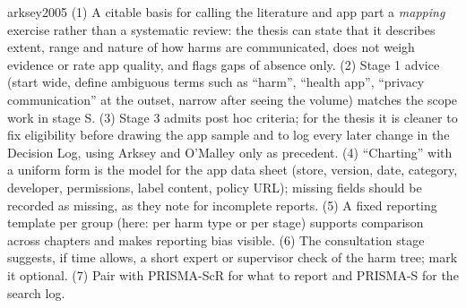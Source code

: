 \begin{papercard}{arksey2005}
 (1) A citable basis for calling the literature and app part a \emph{mapping} exercise rather than a systematic review: the thesis can state that it describes extent, range and nature of how harms are communicated, does not weigh evidence or rate app quality, and flags gaps of absence only. (2) Stage 1 advice (start wide, define ambiguous terms such as ``harm'', ``health app'', ``privacy communication'' at the outset, narrow after seeing the volume) matches the scope work in stage S. (3) Stage 3 admits post hoc criteria; for the thesis it is cleaner to fix eligibility before drawing the app sample and to log every later change in the Decision Log, using Arksey and O'Malley only as precedent. (4) ``Charting'' with a uniform form is the model for the app data sheet (store, version, date, category, developer, permissions, label content, policy URL); missing fields should be recorded as missing, as they note for incomplete reports. (5) A fixed reporting template per group (here: per harm type or per stage) supports comparison across chapters and makes reporting bias visible. (6) The consultation stage suggests, if time allows, a short expert or supervisor check of the harm tree; mark it optional. (7) Pair with PRISMA-ScR for what to report and PRISMA-S for the search log.
\end{papercard}
